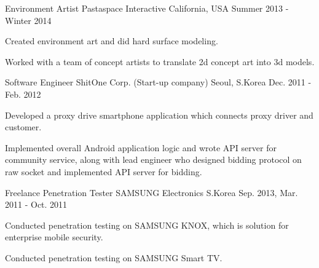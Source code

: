 \begin{cventries}
  \cventry
	{Environment Artist} %
    {Pastaspace Interactive} %
    {California, USA} %
    {Summer 2013 - Winter 2014} %
    {
      \begin{cvitems} %
        \item {Created environment art and did hard surface modeling.}
        \item {Worked with a team of concept artists to translate 2d concept art into 3d models.}
      \end{cvitems}
    }

  \cventry
    {Software Engineer} %
    {ShitOne Corp. (Start-up company)} %
    {Seoul, S.Korea} %
    {Dec. 2011 - Feb. 2012} %
    {
      \begin{cvitems} %
        \item {Developed a proxy drive smartphone application which connects proxy driver and customer.}
        \item {Implemented overall Android application logic and wrote API server for community service, along with lead engineer who designed bidding protocol on raw socket and implemented API server for bidding.}
      \end{cvitems}
    }

  \cventry
    {Freelance Penetration Tester} %
    {SAMSUNG Electronics} %
    {S.Korea} %
    {Sep. 2013, Mar. 2011 - Oct. 2011} %
    {
      \begin{cvitems} %
        \item {Conducted penetration testing on SAMSUNG KNOX, which is solution for enterprise mobile security.}
        \item {Conducted penetration testing on SAMSUNG Smart TV.}
      \end{cvitems}
    }

\end{cventries}
